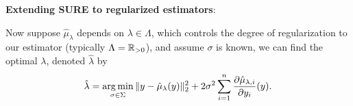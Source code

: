 \textbf{Extending SURE to regularized estimators}:

Now suppose $\hat{\mu}_\lambda$ depends on $\lambda\in\Lambda$, which controls the degree of regularization to our estimator (typically $\Lambda = \mathbb{R}_{>0}$), and assume $\sigma$ is known, we can find the optimal $\lambda$, denoted $\hat{\lambda}$ by
\[
\hat{\lambda} = \argmin_{\sigma\in\Sigma} \| y - \hat{\mu}_\lambda(y) \|_2^2 + 2\sigma^2 \sum_{i=1}^n \frac{\partial \hat{\mu}_{\lambda, i}}{\partial y_i}(y).
\]